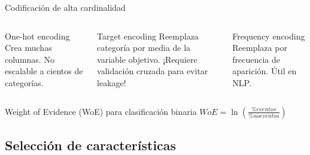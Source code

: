 \documentclass[aspectratio=169, 10pt, xcolor=table]{beamer}
\begin{document}
\begin{frame}{Codificación de alta cardinalidad}
    \begin{columns}[t]
        \begin{block}{One-hot encoding}
            Crea muchas columnas. No escalable a cientos de categorías.
        \end{block}
        \begin{block}{Target encoding}
            Reemplaza categoría por media de la variable objetivo. ¡Requiere validación cruzada para evitar leakage!
        \end{block}
        \begin{block}{Frequency encoding}
            Reemplaza por frecuencia de aparición. Útil en NLP.
        \end{block}
    \end{columns}
    \vspace{0.2cm}
    \begin{block}{Weight of Evidence (WoE) para clasificación binaria}
        $WoE = \ln\left(\frac{\%eventos}{\%no eventos}\right)$
    \end{block}
\end{frame}

\subsection{Selección de características}
\end{document}
